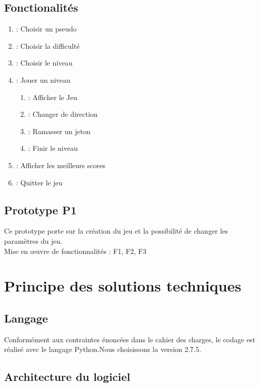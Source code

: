 \documentclass[a4paper,11pt]{scrartcl}
\begin{document}
\subsection{Fonctionalités}

\begin{enumerate}[label*= F\arabic*,font = \textbf]
    \item : Choisir un pseudo
    \item : Choisir la difficulté
    \item : Choisir le niveau
    \item : Jouer un niveau
    \begin{enumerate}[label*=.\arabic*,font = \textbf]
        \item : Afficher le Jeu
        \item : Changer de direction
        \item : Ramasser un jeton
        \item : Finir le niveau
    \end{enumerate}
    \item : Afficher les meilleurs scores
    \item : Quitter le jeu
\end{enumerate}

\subsection{Prototype P1}

Ce prototype porte sur la création du jeu et la possibilité de changer les paramètres du jeu.\\
Mise en œuvre de fonctionnalités : F1, F2, F3

\section{Principe des solutions techniques}

\subsection{Langage}

Conformément aux contraintes énoncées dans le cahier des charges, le codage est réalisé avec le langage Python.Nous choisissons la version 2.7.5.

\subsection{Architecture du logiciel}
\end{document}
